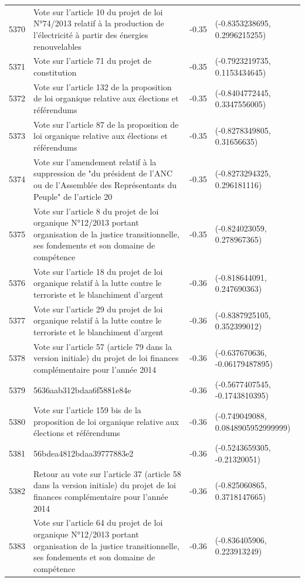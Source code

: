 \begin{table}[ht]
\begin{tabular}{rlrl}
  5370 & Vote sur l'article 10 du projet de loi N°74/2013 relatif à la production de l'électricité à partir des énergies renouvelables & -0.35 & (-0.8353238695, 0.2996215255) \\ 
  5371 & Vote sur l'article 71 du projet de constitution & -0.35 & (-0.7923219735, 0.1153434645) \\ 
  5372 & Vote sur l'article 132 de la proposition de loi organique relative aux élections et référendums & -0.35 & (-0.8404772445, 0.3347556005) \\ 
  5373 & Vote sur l'article 87 de la proposition de loi organique relative aux élections et référendums & -0.35 & (-0.8278349805, 0.31656635) \\ 
  5374 & Vote sur l'amendement relatif à la suppression de "du président de l’ANC ou de l’Assemblée des Représentants du Peuple" de l'article 20 & -0.35 & (-0.8273294325, 0.296181116) \\ 
  5375 & Vote sur l'article 8 du projet de loi organique N°12/2013 portant organisation de la justice transitionnelle, ses fondements et son domaine de compétence & -0.35 & (-0.824023059, 0.278967365) \\ 
  5376 & Vote sur l'article 18 du projet de loi organique relatif à la lutte contre le terroriste et le blanchiment d'argent & -0.36 & (-0.818644091, 0.247690363) \\ 
  5377 & Vote sur l'article 29 du projet de loi organique relatif à la lutte contre le terroriste et le blanchiment d'argent & -0.36 & (-0.8387925105, 0.352399012) \\ 
  5378 & Vote sur l'article 57 (article 79 dans la version initiale) du projet de loi finances complémentaire pour l'année 2014 & -0.36 & (-0.637670636, -0.06179487895) \\ 
  5379 & 5636aab312bdaa6f5881e84e & -0.36 & (-0.5677407545, -0.1743810395) \\ 
  5380 & Vote sur l'article 159 bis de la proposition de loi organique relative aux élections et référendums & -0.36 & (-0.749049088, 0.0848905952999999) \\ 
  5381 & 56bdea4812bdaa39777883e2 & -0.36 & (-0.5243659305, -0.21320051) \\ 
  5382 & Retour au vote sur l'article 37 (article 58 dans la version initiale) du projet de loi finances complémentaire pour l'année 2014 & -0.36 & (-0.825060865, 0.3718147665) \\ 
  5383 & Vote sur l'article 64 du projet de loi organique N°12/2013 portant organisation de la justice transitionnelle, ses fondements et son domaine de compétence & -0.36 & (-0.836405906, 0.223913249) \\ 

\end{tabular}
\end{table}
